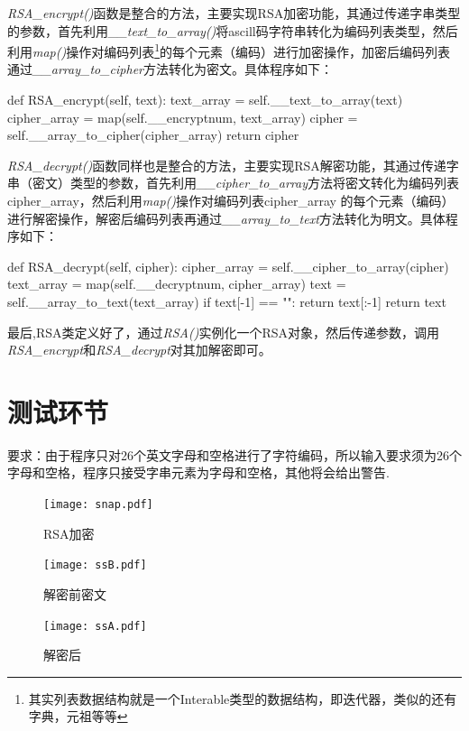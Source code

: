\documentclass[UTF8,nofonts,cs4size]{ctexrep}
\begin{document}
\indent \textit{RSA\_encrypt()}函数是整合的方法，主要实现RSA加密功能，其通过传递字串类型的参数，首先利用\textit{\_\_text\_to\_array()}将ascill码字符串转化为编码列表类型，然后利用\textit{map()}操作对编码列表\footnote{其实列表数据结构就是一个Interable类型的数据结构，即迭代器，类似的还有字典，元祖等等}的每个元素（编码）进行加密操作，加密后编码列表通过\textit{\_\_array\_to\_cipher}方法转化为密文。具体程序如下：
\begin{python}
def RSA_encrypt(self, text):
        text_array = self.__text_to_array(text)
        cipher_array = map(self.__encryptnum, text_array)
        cipher = self.__array_to_cipher(cipher_array)
        return cipher

\end{python}

\indent \textit{RSA\_decrypt()}函数同样也是整合的方法，主要实现RSA解密功能，其通过传递字串（密文）类型的参数，首先利用\textit{\_\_cipher\_to\_array}方法将密文转化为编码列表 cipher\_array，然后利用\textit{map()}操作对编码列表cipher\_array 的每个元素（编码）进行解密操作，解密后编码列表再通过\textit{\_\_array\_to\_text}方法转化为明文。具体程序如下：
\begin{python}

    def RSA_decrypt(self, cipher):
        cipher_array = self.__cipher_to_array(cipher)
        text_array = map(self.__decryptnum, cipher_array)
        text = self.__array_to_text(text_array)
        if text[-1] == "\0":
            return text[:-1]
        return text

\end{python}

\indent 最后,RSA类定义好了，通过\textit{RSA()}实例化一个RSA对象，然后传递参数，调用\textit{RSA\_encrypt}和\textit{RSA\_decrypt}对其加解密即可。

\section{测试环节}
要求：由于程序只对26个英文字母和空格进行了字符编码，所以输入要求须为26个字母和空格，程序只接受字串元素为字母和空格，其他将会给出警告.
\begin{figure}{}
\centering
\texttt{[image: snap.pdf]}
\caption{RSA加密}
\end{figure}

\begin{figure}{}
\centering
\texttt{[image: ssB.pdf]}
\caption{解密前密文}
\end{figure}

\begin{figure}{}
\centering
\texttt{[image: ssA.pdf]}
\caption{解密后}
\end{figure}
\end{document}
